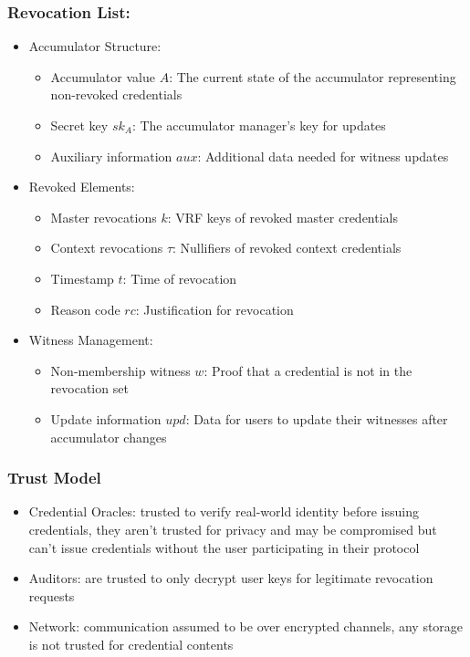 \subsubsection{Revocation List:} 
\begin{itemize}
    \item Accumulator Structure:
    \begin{itemize}
        \item Accumulator value $A$: The current state of the accumulator representing non-revoked credentials
        \item Secret key $sk_A$: The accumulator manager's key for updates
        \item Auxiliary information $aux$: Additional data needed for witness updates
    \end{itemize}
    \item Revoked Elements:
    \begin{itemize}
        \item Master revocations $k$: VRF keys of revoked master credentials
        \item Context revocations $\tau$: Nullifiers of revoked context credentials
        \item Timestamp $t$: Time of revocation
        \item Reason code $rc$: Justification for revocation
    \end{itemize}
    \item Witness Management:
    \begin{itemize}
        \item Non-membership witness $w$: Proof that a credential is not in the revocation set
        \item Update information $upd$: Data for users to update their witnesses after accumulator changes
    \end{itemize}
\end{itemize}


\subsubsection{Trust Model}
\begin{itemize}
    \item Credential Oracles: trusted to verify real-world identity before issuing credentials, they aren't trusted for privacy and may be compromised but can't issue credentials without the user participating in their protocol

    \item Auditors: are trusted to only decrypt user keys for legitimate revocation requests

    \item Network: communication assumed to be over encrypted channels, any storage is not trusted for credential contents
\end{itemize}

